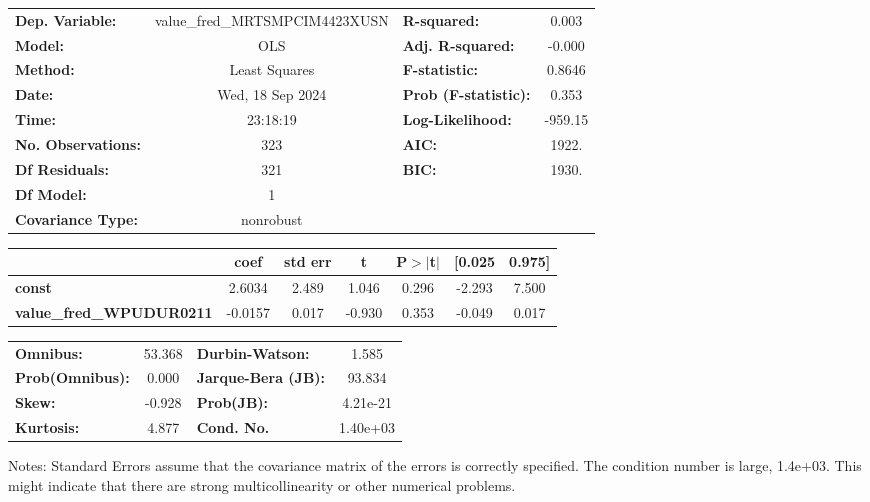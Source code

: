 \begin{center}
\begin{tabular}{lclc}
\toprule
\textbf{Dep. Variable:}          & value\_fred\_MRTSMPCIM4423XUSN & \textbf{  R-squared:         } &     0.003   \\
\textbf{Model:}                  &              OLS               & \textbf{  Adj. R-squared:    } &    -0.000   \\
\textbf{Method:}                 &         Least Squares          & \textbf{  F-statistic:       } &    0.8646   \\
\textbf{Date:}                   &        Wed, 18 Sep 2024        & \textbf{  Prob (F-statistic):} &    0.353    \\
\textbf{Time:}                   &            23:18:19            & \textbf{  Log-Likelihood:    } &   -959.15   \\
\textbf{No. Observations:}       &                323             & \textbf{  AIC:               } &     1922.   \\
\textbf{Df Residuals:}           &                321             & \textbf{  BIC:               } &     1930.   \\
\textbf{Df Model:}               &                  1             & \textbf{                     } &             \\
\textbf{Covariance Type:}        &           nonrobust            & \textbf{                     } &             \\
\bottomrule
\end{tabular}
\begin{tabular}{lcccccc}
                                 & \textbf{coef} & \textbf{std err} & \textbf{t} & \textbf{P$> |$t$|$} & \textbf{[0.025} & \textbf{0.975]}  \\
\midrule
\textbf{const}                   &       2.6034  &        2.489     &     1.046  &         0.296        &       -2.293    &        7.500     \\
\textbf{value\_fred\_WPUDUR0211} &      -0.0157  &        0.017     &    -0.930  &         0.353        &       -0.049    &        0.017     \\
\bottomrule
\end{tabular}
\begin{tabular}{lclc}
\textbf{Omnibus:}       & 53.368 & \textbf{  Durbin-Watson:     } &    1.585  \\
\textbf{Prob(Omnibus):} &  0.000 & \textbf{  Jarque-Bera (JB):  } &   93.834  \\
\textbf{Skew:}          & -0.928 & \textbf{  Prob(JB):          } & 4.21e-21  \\
\textbf{Kurtosis:}      &  4.877 & \textbf{  Cond. No.          } & 1.40e+03  \\
\bottomrule
\end{tabular}
\end{center}

Notes: \newline
 [1] Standard Errors assume that the covariance matrix of the errors is correctly specified. \newline
 [2] The condition number is large, 1.4e+03. This might indicate that there are \newline
 strong multicollinearity or other numerical problems.
